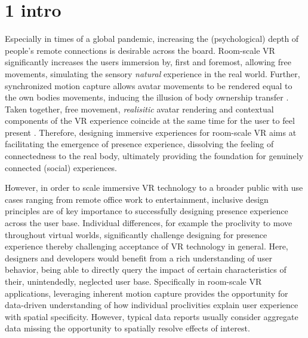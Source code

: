 \section{1 intro}
Especially in times of a global pandemic, increasing the (psychological) depth of people's remote connections is desirable across the board. Room-scale VR significantly increases the users immersion by, first and foremost, allowing free movements, simulating the sensory \textit{natural} experience in the real world. Further, synchronized motion capture allows avatar movements to be rendered equal to the own bodies movements, inducing the illusion of body ownership transfer \cite{Kilteni2012}. Taken together, free movement, \textit{realisitic} avatar rendering and contextual components of the VR experience coincide at the same time for the user to feel present \cite{Gonzalez-Franco2017}. Therefore, designing immersive experiences for room-scale VR aims at facilitating the emergence of presence experience, dissolving the feeling of connectedness to the real body, ultimately providing the foundation for genuinely connected (social) experiences. 

However, in order to scale immersive VR technology to a broader public with use cases ranging from remote office work to entertainment, inclusive design principles are of key importance to successfully designing presence experience across the user base. Individual differences, for example the proclivity to move throughout virtual worlds, significantly challenge designing for presence experience thereby challenging acceptance of VR technology in general. Here, designers and developers would benefit from a rich understanding of user behavior, being able to directly query the impact of certain characteristics of their, unintendedly, neglected user base. Specifically in room-scale VR applications, leveraging inherent motion capture provides the opportunity for data-driven understanding of how individual proclivities explain user experience with spatial specificity. However, typical data reports usually consider aggregate data missing the opportunity to spatially resolve effects of interest.

